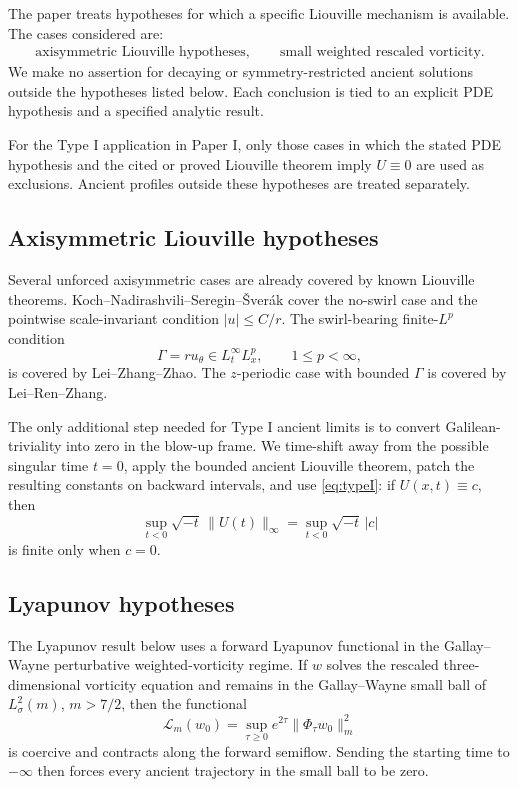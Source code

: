 \documentclass[11pt]{amsart}
\theoremstyle{plain}
\theoremstyle{definition}
\theoremstyle{remark}
\numberwithin{equation}{section}
\begin{document}
The paper treats hypotheses for which a specific Liouville mechanism is
available.  The cases considered are:
\[
   \begin{gathered}
   \text{axisymmetric Liouville hypotheses},\qquad
   \text{small weighted rescaled vorticity}.
   \end{gathered}
\]
We make no assertion for decaying or symmetry-restricted ancient solutions
outside the hypotheses listed below.  Each conclusion is tied to an explicit
PDE hypothesis and a specified analytic result.

For the Type I application in Paper I, only those cases in which the stated
PDE hypothesis and the cited or proved Liouville theorem imply \(U\equiv0\)
are used as exclusions.  Ancient profiles outside these hypotheses are treated
separately.

\subsection{Axisymmetric Liouville hypotheses}

Several unforced axisymmetric cases are already covered by known Liouville
theorems.  Koch--Nadirashvili--Seregin--\v{S}ver\'ak cover the no-swirl case
and the pointwise scale-invariant condition \(|u|\le C/r\).  The
swirl-bearing finite-\(L^p\) condition
\[
   \Gamma=ru_\theta\in L_t^\infty L_x^p,\qquad 1\le p<\infty,
\]
is covered by Lei--Zhang--Zhao.  The \(z\)-periodic case with bounded
\(\Gamma\) is covered by Lei--Ren--Zhang.

The only additional step needed for Type I ancient limits is to convert
Galilean-triviality into zero in the blow-up frame.  We time-shift away from
the possible singular time \(t=0\), apply the bounded ancient Liouville
theorem, patch the resulting constants on backward intervals, and use
\eqref{eq:typeI}: if \(U(x,t)\equiv c\), then
\[
   \sup_{t<0}\sqrt{-t}\,\|U(t)\|_\infty
   =
   \sup_{t<0}\sqrt{-t}\,|c|
\]
is finite only when \(c=0\).

\subsection{Lyapunov hypotheses}

The Lyapunov result below uses a forward Lyapunov functional in the
Gallay--Wayne perturbative weighted-vorticity regime.  If \(w\)
solves the rescaled three-dimensional vorticity equation and remains in the
Gallay--Wayne small ball of \(L^2_\sigma(m)\), \(m>7/2\), then the functional
\begin{equation}\label{eq:intro-weighted-lyap}
   \mathcal L_m(w_0)
   =
   \sup_{\tau\ge0}e^{2\tau}\|\Phi_\tau w_0\|_m^2
\end{equation}
is coercive and contracts along the forward semiflow.  Sending the starting
time to \(-\infty\) then forces every ancient trajectory in the small ball to
be zero.
\end{document}
